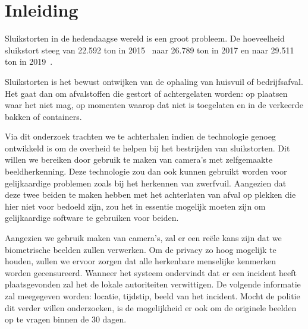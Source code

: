 \documentclass{hogent-article}
\affiliation{
  \textsuperscript{1} \href{mailto:mehmet.karademir@student.hogent.be}{mehmet.karademir@student.hogent.be}}
\affiliation{
  \textsuperscript{2} \href{mailto:nermin.dubinovic@student.hogent.be}{nermin.dubinovic@student.hogent.be}
}
\begin{document}
\flushbottom %
\maketitle %
\tableofcontents %
\thispagestyle{empty} %


\section{Inleiding}


Sluikstorten in de hedendaagse wereld is een groot probleem. De hoeveelheid sluikstort steeg van 22.592 ton in 2015~\autocite{Bilsen2018} naar 26.789 ton in 2017 en naar 29.511 ton in 2019~\autocite{Wolf2020}.

Sluikstorten is het bewust ontwijken van de ophaling van huisvuil of bedrijfsafval. Het gaat dan om afvalstoffen die gestort of achtergelaten worden: op plaatsen waar het niet mag, op momenten waarop dat niet is toegelaten en in de verkeerde bakken of containers.

Via dit onderzoek trachten we te achterhalen indien de technologie genoeg ontwikkeld is om de overheid te helpen bij het bestrijden van sluikstorten. Dit willen we bereiken door gebruik te maken van camera's met zelfgemaakte beeldherkenning.
Deze technologie zou dan ook kunnen gebruikt worden voor gelijkaardige problemen zoals bij het herkennen van zwerfvuil. Aangezien dat deze twee beiden te maken hebben met het achterlaten van afval op plekken die hier niet voor bedoeld zijn, zou het in essentie mogelijk moeten zijn om gelijkaardige software te gebruiken voor beiden.

Aangezien we gebruik maken van camera's, zal er een reële kans zijn dat we biometrische beelden zullen verwerken. Om de privacy zo hoog mogelijk te houden, zullen we ervoor zorgen dat alle herkenbare menselijke kenmerken worden gecensureerd.
Wanneer het systeem ondervindt dat er een incident heeft plaatsgevonden zal het de lokale autoriteiten verwittigen. De volgende informatie zal meegegeven worden: locatie, tijdstip, beeld van het incident. Mocht de politie dit verder willen onderzoeken, is de mogelijkheid er ook om de originele beelden op te vragen binnen de 30 dagen.
\end{document}
